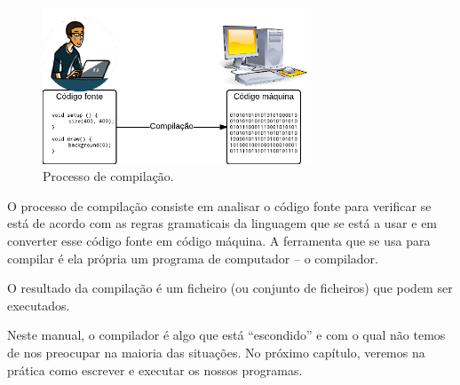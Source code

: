 \begin{figure}[!ht]
	\centering
		\includegraphics[width=8cm]{images/DiagramaCompilacao.pdf}
	\caption{Processo de compilação.}
	\label{fig:processo-compilacao}
\end{figure}

O processo de compilação consiste em analisar o código fonte para verificar se está de acordo com as regras gramaticais da linguagem que se está a usar e em converter esse código fonte em código máquina. A ferramenta que se usa para compilar é ela própria um programa de computador -- o compilador. 

O resultado da compilação é um ficheiro (ou conjunto de ficheiros) que podem ser executados.

Neste manual, o compilador é algo que está ``escondido'' e com o qual não temos de nos preocupar na maioria das situações. No próximo capítulo, veremos na prática como escrever e executar os nossos programas.


